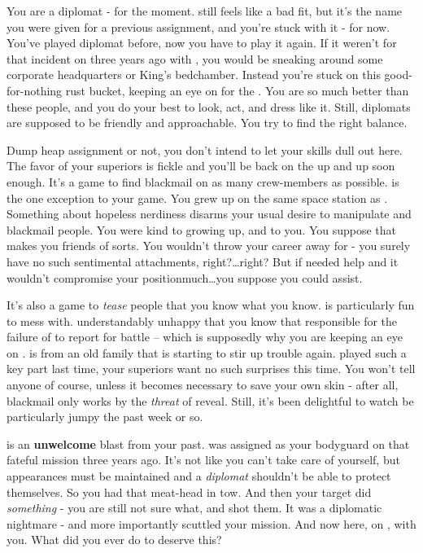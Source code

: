 \documentclass[char]{TMFHope}
\begin{document}
\name{\cDip{}}

You are a diplomat - for the moment. \cDip{\full} still feels like a bad fit, but it's the name you were given for a previous assignment, and you're stuck with it - for now. You've played diplomat before, now you have to play it again. If it weren't for that incident on \pHome{} three years ago with \cWeap{\full}, you would be sneaking around some corporate headquarters or King's bedchamber. Instead you're stuck on this good-for-nothing rust bucket, keeping an eye on \cXO{\full} for the \pPlan{}. You are so much better than these people, and you do your best to look, act, and dress like it. Still, diplomats are supposed to be friendly and approachable. You try to find the right balance.

Dump heap assignment or not, you don't intend to let your skills dull out here. The favor of your superiors is fickle and you'll be back on the up and up soon enough. It's a game to find blackmail on as many crew-members as possible. \cMed{\full} is the one exception to your game. You grew up on the same space station as \cMed{\them}. Something about \cMed{\their} hopeless nerdiness disarms your usual desire to manipulate and blackmail people. You were kind to \cMed{\them} growing up, and \cMed{\they} to you. You suppose that makes you friends of sorts. You wouldn't throw your career away for \cMed{\them} - you surely have no such sentimental attachments, right?\ldots right? But if \cMed{} needed help and it wouldn't compromise your position\ldotstoo much\ldots you suppose you could assist.

It's also a game to \emph{tease} people that you know what you know. \cXO{} is particularly fun to mess with. \cXO{\They} \cXO{\are} understandably unhappy that you know that \cXO{\they} \cXO{\are} responsible for the failure of \pOld{} to report for battle -- which is supposedly why you are keeping an eye on \cXO{\them}. \cXO{} is from an old \pEdge{} family that is starting to stir up trouble again. \cXO{\They} played such a key part last time, your superiors want no such surprises this time. You won't tell anyone of course, unless it becomes necessary to save your own skin - after all, blackmail only works by the \emph{threat} of reveal. Still, it's been delightful to watch \cXO{} be particularly jumpy the past week or so. 

\cWeap{} is an {\bf unwelcome} blast from your past. \cWeap{} was assigned as your bodyguard on that fateful mission three years ago. It's not like you can't take care of yourself, but appearances must be maintained and a \emph{diplomat} shouldn't be able to protect themselves. So you had that meat-head in tow. And then your target did \emph{something} - you are still not sure what, and \cWeap{} shot them. It was a diplomatic nightmare - and more importantly scuttled your mission. And now \cWeap{\they} \cWeap{\are} here, on \pNew{}, with you. What did you ever do to deserve this?
\end{document}
